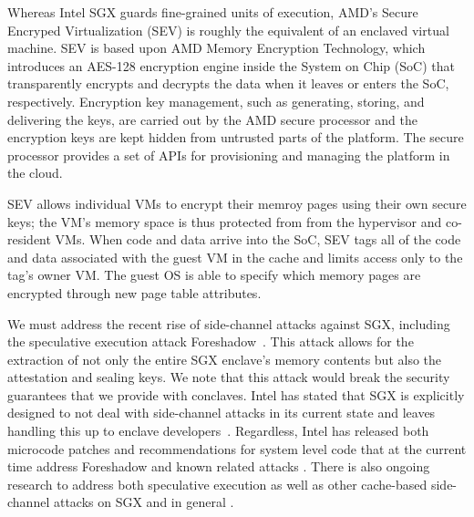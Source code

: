 %
Whereas Intel SGX guards fine-grained units of execution, AMD's Secure
Encryped Virtualization (SEV) is roughly the equivalent of an enclaved
virtual machine.
%
SEV is based upon AMD Memory Encryption Technology, which introduces an
AES-128 encryption engine inside the System on Chip (SoC) that transparently
encrypts and decrypts the data when it leaves or enters the SoC, respectively.
%
Encryption key management, such as generating, storing, and delivering the
keys, are carried out by the AMD secure processor and the encryption keys are kept
hidden from untrusted parts of the platform.
%
The secure processor provides a set of APIs for provisioning and managing the
platform in the cloud.


SEV allows individual VMs to encrypt their memroy pages using their own secure
keys; the VM's memory space is thus protected from from the hypervisor and
co-resident VMs.
%
When code and data arrive into the SoC, SEV tags all of the code and data
associated with the guest VM in the cache and limits access only to the tag's
owner VM.
%
The guest OS is able to specify which memory pages are encrypted through new
page table attributes.


%
We must address the recent rise of side-channel attacks against SGX, including
the speculative execution attack Foreshadow~\cite{foreshadow,
weisse2018foreshadow}.  
%
This attack allows for the extraction of not only the entire SGX enclave's
memory contents but also the attestation and sealing keys.  
%
We note that this attack would break the security guarantees that we provide
with conclaves.
%
Intel has stated that SGX is explicitly designed to not deal with side-channel
attacks in its current state and leaves handling this up to enclave
developers~\cite{sgx-sidechannel, sgx-developers}.
%
Regardless, Intel has released both microcode patches and recommendations for
system level code that at the current time address Foreshadow and known related
attacks \cite{sgx-patch, canella2018systematic, weisse2018foreshadow}.  
%
There is also ongoing research to address both speculative execution as well as
other cache-based side-channel attacks on SGX and in general
\cite{yan2018invisispec, oleksenko2018varys, canella2018systematic, shih2017t}.




